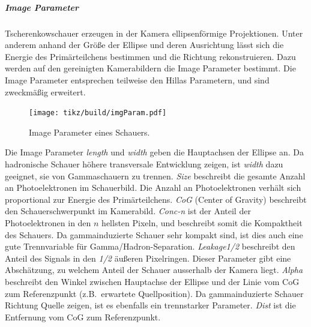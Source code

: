 \subparagraph{Image Parameter}%
\label{spar:image_parameter}

Tscherenkowschauer erzeugen in der Kamera ellipsenförmige Projektionen.
Unter anderem anhand der Größe der Ellipse und deren Ausrichtung
lässt sich die Energie des
Primärteilchens bestimmen und die Richtung rekonstruieren.
Dazu werden auf den gereinigten Kamerabildern die Image Parameter bestimmt.
Die Image Parameter entsprechen teilweise den Hillas Parametern,
und sind zweckmäßig erweitert.


\begin{figure}
  \centering
  \texttt{[image: tikz/build/imgParam.pdf]}
  \caption{Image Parameter eines Schauers.}%
  \label{fig:hillas}
\end{figure}

Die Image Parameter \textit{length} und \textit{width} geben die Hauptachsen
der Ellipse an.
Da hadronische Schauer höhere transversale Entwicklung zeigen, ist
\textit{width} dazu geeignet, sie von Gammaschauern zu trennen.
\textit{Size} beschreibt die gesamte Anzahl an Photoelektronen im Schauerbild.
Die Anzahl an Photoelektronen verhält sich proportional zur Energie des
Primärteilchens.
\textit{CoG} (Center of Gravity) beschreibt den Schauerschwerpunkt im Kamerabild.
\textit{Conc-n} ist der Anteil der Photoelektronen in den $n$ hellsten Pixeln,
und beschreibt somit die Kompaktheit des Schauers.
Da gammainduzierte Schauer sehr kompakt sind, ist dies auch eine gute
Trennvariable für Gamma/Hadron-Separation.
\textit{Leakage1/2} beschreibt den Anteil des Signals in den \textit{1/2} äußeren
Pixelringen.
Dieser Parameter gibt eine Abschätzung,
zu welchem Anteil der Schauer ausserhalb der Kamera liegt.
\textit{Alpha} beschreibt den Winkel zwischen Hauptachse der Ellipse und
der Linie vom CoG zum Referenzpunkt (z.B.\ erwartete Quellposition).
Da gammainduzierte Schauer Richtung Quelle zeigen,
ist es ebenfalls ein trennstarker Parameter.
\textit{Dist} ist die Entfernung vom CoG zum Referenzpunkt.
